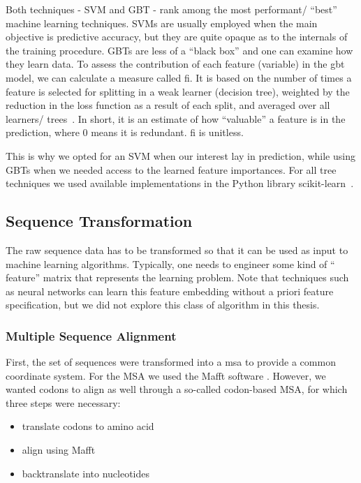 Both techniques - SVM and GBT - rank among the most performant/ ``best'' machine learning techniques. SVMs are usually employed when the main objective is predictive accuracy, but they are quite opaque as to the internals of the training procedure. GBTs are less of a ``black box'' and one can examine how they learn data. To assess the contribution of each feature (variable) in the \gls{gbt} model, we can calculate a measure called \gls{fi}. It is based on the number of times a feature is selected for splitting in a weak learner (decision tree), weighted by the reduction in the loss function as a result of each split, and averaged over all learners/ trees~\cite{Elith2008-xp}. In short, it is an estimate of how ``valuable'' a feature is in the prediction, where 0 means it is redundant. \gls{fi} is unitless.

This is why we opted for an SVM when our interest lay in prediction, while using GBTs when we needed access to the learned feature importances. For all tree techniques we used available implementations in the Python library scikit-learn~\cite{Pedregosa2011-yy}.


\subsection{Sequence Transformation}

The raw sequence data has to be transformed so that it can be used as input to machine learning algorithms. Typically, one needs to engineer some kind of ``
feature'' matrix that represents the learning problem. Note that techniques such as neural networks can learn this feature embedding without a priori feature specification, but we did not explore this class of algorithm in this thesis.


\subsubsection{Multiple Sequence Alignment}

First, the set of sequences were transformed into a \gls{msa} to provide a common coordinate system. For the MSA we used the Mafft software \cite{Katoh2016-yq, Katoh2002-in, Katoh2013-eh}. However, we wanted codons to align as well through a so-called codon-based MSA, for which three steps were necessary:


\begin{itemize}
    \item translate codons to amino acid
    \item align using Mafft
    \item backtranslate into nucleotides
\end{itemize}


